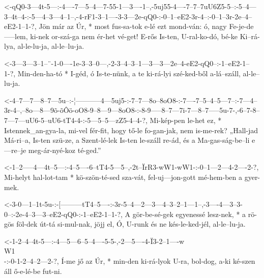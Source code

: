   {<-qQ0-3---4t-5---:-4----7---5--4---7-55-1---3----1--,-5uj55-4----7--7--7uU6Z5-5--:-5--4---3--4t--4-:-5---4--3---4--1--,-4-rF1-3--1----3-3---2e-qQ0-:-0--1--eE2-3r-4--:-0--1--3r-2e--4--eE2-1--1-?,}
  {  Jön már az Úr, * most fus-sa-tok e-lé ezt mond-ván: ó,    nagy Fe-je-de-----lem, ki-nek or-szá-ga  nem ér-het vé-get! E-rős Is-ten, U-ral-ko-dó,   bé-ke Ki--rá-lya, al-le-lu-ja, al-le--lu-ja.}

  {<-3---3---3--1--¨-1-0----1e-3--3--0---,-2-3--4--3--1---3---3---2e--4-eE2-qQ0--:-1--eE2-1--1-?,}
  {  Min-den-ha-tó * I-géd, ó  Is-te-nünk, a te ki-rá-lyi szé-ked-ből a-lá--száll, al-le--lu-ja.}

  {<-4--7---7---8--7---5u--:-¦-----------4---5uj5-:-7--7---8o--8oO8-:-7----7--5--4--5---7--:-7---4--3r-4--,--8o---8---9õ-õÔö-oO8-9--8---9---8oO8-:-8-9-----8--7---7i-7---8--7-----5u-7-,-6--7-8--7---7---uU6-5--uU6-tT4-4-:-5---5--5---zZ5-4--4-?,}
  {  Mi-kép-pen le-het ez, * Istennek_an-gya-la,    mi-vel fér-fit,   hogy tő-le fo-gan-jak, nem is-me-rek? „Hall-jad Má-ri--a,  Is-ten szü-ze,    a Szent-lé-lek Is-ten le-száll re-ád, és a Ma-gas-ság-be--li e---re--je  meg-ár-nyé-koz té-ged.”}

  {<-1--2-----4---4t--5---:-4--5----6--tT4-5---5--,-2t--ÏrR3-wW1-wW1-:-0--1---2---4-2----2-?,}
  {  Mi-helyt hal-lot-tam * kö-szön-té-sed sza-vát, fel-uj---jon-gott  mé-hem-ben a gyer-mek.}


  {<-3-0---1--1t-5u-:-[---------tT4--5----:-3r-5--4---2---3---4--3--2--1---1--,-3----4---3--3-0--:-2e-4--3---3--eE2-qQ0-:-1--eE2-1--1-?,}
  {  A gör-be-sé-gek  egyenessé lesz-nek, * a  rö-gös föl-dek út-tá si-mul-nak, jöjj el, Ó, U-runk és ne kés-le-ked-jél,  al-le--lu-ja.}



  {<-1-2--4--4t-5---:-4---5---6--5--4----5-5-,-2---5----4-Ï3-2--1----w\\W1\\-:-0-1-2--4--2---2-?,}
  {  Í-me jő az Úr, * min-den ki-rá-lyok U-ra, bol-dog, a-ki ké-szen áll      ő-e-lé-be fut-ni.}

